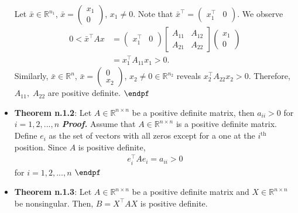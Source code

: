 \documentclass{report}
\begin{document}
\begin{itemize}
            \bigbreak \noindent 
            Let $ \bar{x} \in \mathbb{R}^{n_{1}}$, $ \bar{x} = \begin{pmatrix} x_{1} \\ 0 \end{pmatrix} $, $x_{1} \ne 0 $. Note that $ \bar{x}^{\top} = \begin{pmatrix} x_{1}^{\top} & 0\end{pmatrix} $. We observe
            \begin{align*}
                0 < \bar{x}^{\top} A x &= \begin{pmatrix} x_{1}^{\top} & 0 \end{pmatrix} \begin{bmatrix} A_{11} & A_{12} \\ A_{21} & A_{22} \end{bmatrix} \begin{pmatrix} x_{1} \\ 0 \end{pmatrix} \\
                    &= x_{1}^{\top}A_{11}x_{1} > 0
            .\end{align*}
            Similarly, $ \bar{x} \in \mathbb{R}^{n}$, $ \bar{x} = \begin{pmatrix} 0 \\ x_{2} \end{pmatrix} $, $ x_{2} \ne 0 \in \mathbb{R}^{n_{2}}$ reveals $x_{2}^{\top}A_{22}x_{2} > 0$.
            \bigbreak \noindent 
            Therefore, $A_{11},\; A_{22}$ are positive definite. $\endpf$
        \item \textbf{Theorem n.1.2}: Let $A \in \mathbb{R}^{n\times n}$ be a positive definite matrix, then $a_{ii} > 0$ for $i = 1,2,...,n $
            \bigbreak \noindent 
            \textbf{\textit{Proof.}} Assume that $A \in \mathbb{R}^{n\times n}$ is a positive definite matrix. Define $e_{i}$ as the set of vectors with all zeros except for a one at the $i^{\text{th}}$ position. Since $A$ is positive definite,
            \begin{align}
                e_{i}^{\top} A e_{i} = a_{ii} > 0
            \end{align}
            for $i = 1,2,...,n$ $ \endpf $
            \bigbreak \noindent 
        \item \textbf{Theorem n.1.3}: Let $A \in \mathbb{R}^{n \times n}$ be a positive definite matrix and $X \in \mathbb{R}^{n\times n}$ be nonsingular. Then, $B = X^{\top}AX$ is positive definite.
            \bigbreak \noindent 
            \begin{remark}

\end{remark}
\end{itemize}
\end{document}
